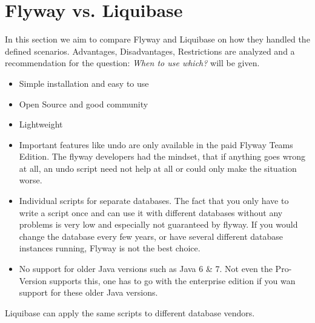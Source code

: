 

\chapter{Flyway vs. Liquibase}
%
In this section we aim to compare Flyway and Liquibase on how they handled the defined scenarios.
Advantages, Disadvantages, Restrictions are analyzed and a recommendation for the question: \textit{When to use which?} will be given.

%

\begin{itemize}
	\item Simple installation and easy to use
	\item Open Source and good community
	\item Lightweight
\end{itemize}

%
\begin{itemize}
	\item Important features like undo are only available in the paid Flyway Teams Edition. The flyway developers had the mindset, that if anything goes wrong at all, an undo script need not help at all or could only make the situation worse.
	\item Individual scripts for separate databases. The fact that you only have to write a script once and can use it with different databases without any problems is very low and especially not guaranteed by flyway. If you would change the database every few years, or have several different database instances running, Flyway is not the best choice.
	\item No support for older Java versions such as Java 6 \& 7. Not even the Pro-Version supports this, one has to go with the enterprise edition if you wan support for these older Java versions.
\end{itemize}

Liquibase can apply the same scripts to different database vendors.

\newpage